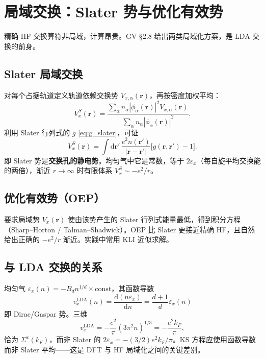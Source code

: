 \section{局域交换：Slater 势与优化有效势}

精确 HF 交换算符非局域，计算昂贵。GV §2.8 给出两类局域化方案，是 LDA 交换的前身。

\subsection{Slater 局域交换}

对每个占据轨道定义轨道依赖交换势 $V_{x,\alpha}(\mathbf{r})$，再按密度加权平均：
\begin{equation}
  V_x^{S}(\mathbf{r})
  =\frac{
  \sum_\alpha n_\alpha|\phi_\alpha(\mathbf{r})|^2 V_{x,\alpha}(\mathbf{r})
  }{
  \sum_\alpha n_\alpha|\phi_\alpha(\mathbf{r})|^2
  }.
\label{eq:slaterVx}
\end{equation}
利用 Slater 行列式的 $g$ \eqref{eq:g_slater}，可证
\begin{equation}
  V_x^{S}(\mathbf{r})
  =\int\mathrm{d}\mathbf{r}'\,
  \frac{e^2 n(\mathbf{r}')}{|\mathbf{r}-\mathbf{r}'|}
  \bigl[g(\mathbf{r},\mathbf{r}')-1\bigr].
\end{equation}
即 Slater 势是\textbf{交换孔的静电势}。均匀气中它是常数，等于 $2\varepsilon_x$（每自旋平均交换能的两倍），渐近 $r\to\infty$ 时有限体系 $V_x^S\sim -e^2/r$。

\subsection{优化有效势（OEP）}

要求局域势 $V_x(\mathbf{r})$ 使由该势产生的 Slater 行列式能量最低，得到积分方程（Sharp--Horton / Talman--Shadwick）。OEP 比 Slater 更接近精确 HF，且自然给出正确的 $-e^2/r$ 渐近。实践中常用 KLI 近似求解。

\subsection{与 LDA 交换的关系}

均匀气 $\varepsilon_x(n)=-B_d n^{1/d}\times\text{const}$，其函数导数
\begin{equation}
  v_x^{\mathrm{LDA}}(n)
  =\frac{\mathrm{d}(n\varepsilon_x)}{\mathrm{d}n}
  =\frac{d+1}{d}\varepsilon_x(n)
\end{equation}
即 Dirac/Gaspar 势。三维
\begin{equation}
  v_x^{\mathrm{LDA}}
  =-\frac{e^2}{\pi}(3\pi^2 n)^{1/3}
  =-\frac{e^2 k_F}{\pi},
\end{equation}
恰为 $\Sigma^{\mathrm{x}}(k_F)$，而非 Slater 的 $2\varepsilon_x=-(3/2)e^2k_F/\pi$。KS 方程应使用函数导数而非 Slater 平均——这是 DFT 与 HF 局域化之间的关键差别。
